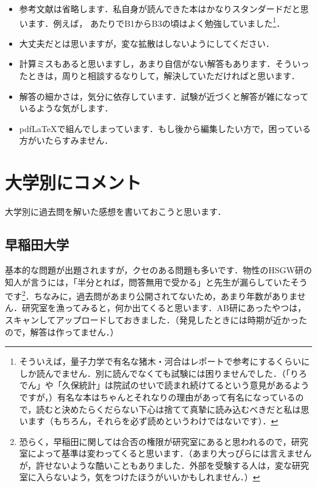\documentclass[a4paper,pdflatex,ja=standard]{bxjsarticle}
\begin{document}
\begin{itemize}
  \item   
  参考文献は省略します．私自身が読んできた本はかなりスタンダードだと思います．例えば，
  \cite{sakurai,landau,kubo,goto,sunagawa_Q,sunagawa_E,tasaki_th,tasaki_stat1,tasaki_stat2}
  あたりでB1からB3の頃はよく勉強していました\footnote{
    そういえば，量子力学で有名な猪木・河合はレポートで参考にするくらいにしか読んでません．別に読んでなくても試験には困りませんでした．（「りろでん」や「久保統計」は院試のせいで読まれ続けてるという意見があるようですが，）有名な本はちゃんとそれなりの理由があって有名になっているので，読むと決めたらくだらない下心は捨てて真摯に読み込むべきだと私は思います（もちろん，それらを必ず読めというわけではないです）．
  }．

  \item 
  大丈夫だとは思いますが，変な拡散はしないようにしてください．
  
  \item 
  計算ミスもあると思いますし，あまり自信がない解答もあります．そういったときは，周りと相談するなりして，解決していただければと思います．
  
  \item
  解答の細かさは，気分に依存しています．試験が近づくと解答が雑になっているような気がします．

  \item 
  pdfLaTeXで組んでしまっています．もし後から編集したい方で，困っている方がいたらすみません．
\end{itemize}



\section{大学別にコメント}

大学別に過去問を解いた感想を書いておこうと思います．


\subsection{早稲田大学}

基本的な問題が出題されますが，クセのある問題も多いです．物性のHSGW研の知人が言うには，「半分とれば，問答無用で受かる」と先生が漏らしていたそうです\footnote{
  恐らく，早稲田に関しては合否の権限が研究室にあると思われるので，研究室によって基準は変わってくると思います．（あまり大っぴらには言えませんが，許せないような酷いこともありました．外部を受験する人は，変な研究室に入らないよう，気をつけたほうがいいかもしれません．）
}．ちなみに，過去問があまり公開されてないため，あまり年数がありません．研究室を漁ってみると，何か出てくると思います．AB研にあったやつは，スキャンしてアップロードしておきました．（発見したときには時期が近かったので，解答は作ってません．）
\end{document}
